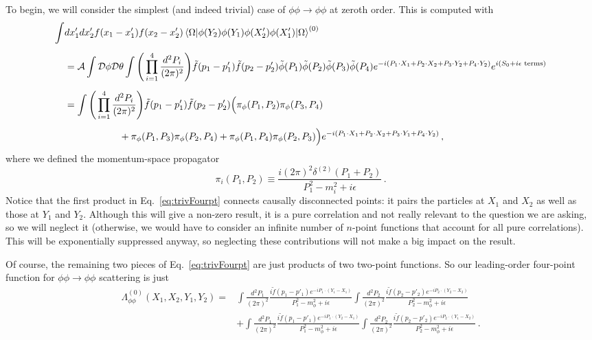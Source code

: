 \documentclass{article}
\newcommand{\td}[1]{\tilde{#1}}
\numberwithin{equation}{subsection}
\begin{document}
To begin, we will consider the simplest (and indeed trivial) case of $\phi\phi\to\phi\phi$ at zeroth order. This is computed with
\begin{equation}\begin{split}\label{eq:trivFourpt}
    \int& dx_1'dx_2' f(x_1-x_1')f(x_2 - x_2')\mel{\Omega}{\phi(Y_2)\phi(Y_1)\phi(X_2')\phi(X_1')}{\Omega}^{(0)}\\[0.5em]
    &= \mathcal{A}\int\mathcal{D}\phi\mathcal{D}\theta\int\Bigg(\prod_{i=1}^4\frac{d^2P_i}{(2\pi)^2}\Bigg)\td f(p_1-p'_1)\td f(p_2-p'_2)\td\phi(P_1)\td\phi(P_2)\td\phi(P_3)\td\phi(P_4)
	e^{-i(P_1\cdot X_1+P_2\cdot X_2 + P_3\cdot Y_2 + P_4\cdot Y_2)}e^{i(S_0+i\epsilon\text{ terms})}\\[0.5em]
    &=\int\Bigg(\prod_{i=1}^4\frac{d^2P_i}{(2\pi)^2}\Bigg)\td f(p_1-p'_1)\td f(p_2-p'_2)\Big(\pi_\phi(P_1,P_2)\pi_\phi(P_3,P_4)\\[0.5em]
    &\hspace{2cm}+ \pi_\phi(P_1,P_3)\pi_\phi(P_2,P_4) + \pi_\phi(P_1,P_4)\pi_\phi(P_2,P_3)\Big)e^{-i(P_1\cdot X_1 + P_2\cdot X_2 + P_3\cdot Y_1 + P_4\cdot Y_2)}\,,
\end{split}\end{equation}
where we defined the momentum-space propagator
\begin{equation}
    \pi_i(P_1, P_2) \equiv \frac{i(2\pi)^2\delta^{(2)}(P_1 + P_2)}{P_1^2 - m_i^2 + i\epsilon}\,.
\end{equation}
Notice that the first product in Eq.~\eqref{eq:trivFourpt} connects causally disconnected points: it pairs the particles at $X_1$ and $X_2$ as well as those at 
$Y_1$ and $Y_2$. Although this will give a non-zero result, it is a pure correlation and not really relevant to the question we are asking, so we will neglect it 
(otherwise, we would have to consider an infinite number of $n$-point functions that account for all pure correlations). This will be exponentially suppressed anyway, so 
neglecting these contributions will not make a big impact on the result.

Of course, the remaining two pieces of Eq.~\eqref{eq:trivFourpt} are just products of two two-point functions. So our leading-order four-point function for $\phi\phi\to\phi\phi$ scattering is just
\begin{equation}\begin{split}
    \Lambda^{(0)}_{\phi\phi}(X_1, X_2, Y_1, Y_2) =& \int\frac{d^2P_1}{(2\pi)^2}\frac{i \td f(p_1-p'_1) e^{-i P_1\cdot (Y_1 - X_1)}}{P_1^2 - m_\phi^2 + i\epsilon}
	\int\frac{d^2P_2}{(2\pi)^2}\frac{i \td f(p_2-p'_2) e^{-i P_2\cdot (Y_2 - X_2)}}{P_2^2 - m_\phi^2 + i\epsilon} \\[0.5em]
    &+\int\frac{d^2P_1}{(2\pi)^2}\frac{i \td f(p_1-p'_1) e^{-i P_1\cdot (Y_2 - X_1)}}{P_1^2 - m_\phi^2 + i\epsilon}\int\frac{d^2P_2}{(2\pi)^2}\frac{i \td f(p_2-p'_2) 
	e^{-i P_2\cdot (Y_1 - X_2)}}{P_2^2 - m_\phi^2 + i\epsilon}\,.
\end{split}\end{equation}
\end{document}
